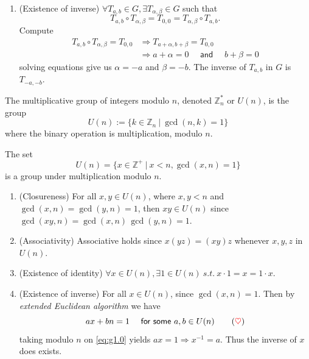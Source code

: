 \begin{solution}
\begin{enumerate}
        \item (Existence of inverse) $\forall T_{a,b} \in G, \exists T_{\alpha, \beta} \in G$ such that 
        \[
            T_{a,b} \circ T_{\alpha, \beta} = T_{0,0} = T_{\alpha, \beta} \circ T_{a,b}. 
        \]
        Compute 
        \begin{align*}
            T_{a,b} \circ T_{\alpha, \beta} = T_{0,0} &\Rightarrow T_{a + \alpha, b + \beta} = T_{0,0}\\
            &\Rightarrow a + \alpha = 0 \quad \textsf{ and } \quad b + \beta = 0
        \end{align*}
        solving equations give us $\alpha = - a$ and $\beta = -b$. The inverse of $T_{a,b}$ in $G$ is $T_{-a, -b}$.
    \end{enumerate}
\end{solution}

\begin{definition}
    The multiplicative group of integers modulo $n$, denoted $\mathbb{Z}^*_n$ or $U(n)$, is the group 
    \[
        U(n) := \{ k \in \mathbb{Z}_n \> | \> \gcd(n,k) = 1 \}
    \]
    where the binary operation is multiplication, modulo $n$.
\end{definition}

\begin{example}
    The set 
    \[
        U(n) = \{ x \in \mathbb{Z}^+ \> | \> x < n, \gcd(x,n) = 1 \}
    \]
    is a group under multiplication modulo $n$.
\end{example}
\begin{solution}
    \begin{enumerate}
        \item (Closureness) For all $x, y \in U(n)$, where $x,y < n$ and $\gcd(x,n) = \gcd(y,n) = 1$, then 
        $xy \in U(n)$ since $\gcd(xy,n) = \gcd(x,n)\, \gcd(y,n) = 1$.

        \item (Associativity) Associative holds since $x(yz) = (xy)z$ whenever $x,y,z$ in $U(n)$.
        \item (Existence of identity) $\forall x \in U(n), \exists 1 \in U(n) \> s.t. \> x \cdot 1 = x = 1 \cdot x$.
        \item (Existence of inverse) For all $x \in U(n)$, since $\gcd(x,n) = 1$. Then by \textit{extended Euclidean algorithm} we have 
        \[
            ax + bn = 1 \quad \textsf{ for some } a,b \in U(n) \label{eq:g1.0} \tag{{\color{red} $\heartsuit$}}
        \]
        taking modulo $n$ on \eqref{eq:g1.0} yields $ax = 1 \Longrightarrow x^{-1} = a$. Thus the inverse of $x$ does exists.
    \end{enumerate}
\end{solution}

